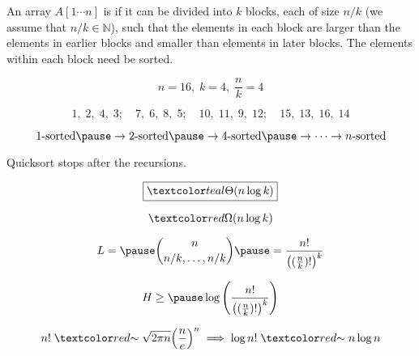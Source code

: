 
\begin{frame}{}
  \centerline{}
\end{frame}

\begin{frame}{}
  \begin{definition}
    An array $A[1 \cdots n]$ is  if it can be divided into $k$ blocks, 
    each of size $n/k$ (we assume that $n/k \in \mathbb{N}$), 
    such that the elements in each block are larger than the elements 
    in earlier blocks and smaller than elements in later blocks. 
    The elements within each block need  be sorted.
  \end{definition}

  \[
    n = 16,\; k = 4,\; \frac{n}{k} = 4
  \]

  \[
    1,\;2,\;4,\;3;\quad 7,\;6,\;8,\;5;\quad 10,\;11,\;9,\;12;\quad 15,\;13,\;16,\;14
  \]
\end{frame}

\begin{frame}{}
  \centerline{}

  \pause
  \[
    1\text{-sorted} \pause \to 2\text{-sorted} \pause \to 4\text{-sorted} \pause \to \cdots \to n\text{-sorted}
  \]

  \pause
  \centerline{Quicksort  stops after the  recursions.}

  \pause
  \vspace{0.50cm}
  \[
    \boxed{\teal{\Theta(n \log k)}}
  \]
\end{frame}

\begin{frame}{}
  \[
    \red{\Omega(n \log k)}
  \]

  \pause
  \[
    L = \pause\binom{n}{n/k, \ldots, n/k} \pause = \frac{n!}{\left( (\frac{n}{k})! \right)^{k}}
  \]

  \pause
  \[
    H \ge \pause \log \left(\frac{n!}{\left( (\frac{n}{k})! \right)^{k}} \right)
  \]

  \pause
  \[
    n! \;\red{\sim}\; \sqrt{2 \pi n} \Big(\frac{n}{e}\Big)^{n} \implies \log n! \;\red{\sim}\; n \log n
  \]
\end{frame}

% 
% 
% 

